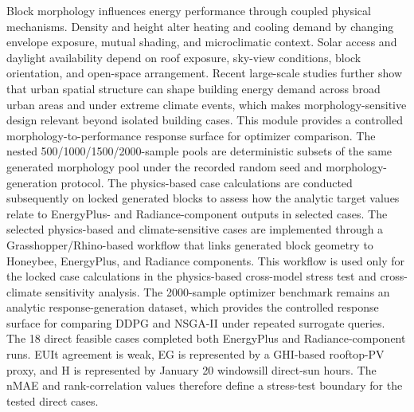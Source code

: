 \documentclass[10pt]{article}
\begin{document}
\begin{revisionbox}
Block morphology influences energy performance through coupled physical mechanisms. Density and height alter heating and cooling demand by changing envelope exposure, mutual shading, and microclimatic context. Solar access and daylight availability depend on roof exposure, sky-view conditions, block orientation, and open-space arrangement. Recent large-scale studies further show that urban spatial structure can shape building energy demand across broad urban areas and under extreme climate events, which makes morphology-sensitive design relevant beyond isolated building cases.
\revisionseparator
{}
This module provides a controlled morphology-to-performance response surface for optimizer comparison. The nested 500/1000/1500/2000-sample pools are deterministic subsets of the same generated morphology pool under the recorded random seed and morphology-generation protocol. The physics-based case calculations are conducted subsequently on locked generated blocks to assess how the analytic target values relate to EnergyPlus- and Radiance-component outputs in selected cases.
\revisionseparator
{}
The selected physics-based and climate-sensitive cases are implemented through a Grasshopper/Rhino-based workflow that links generated block geometry to Honeybee, EnergyPlus, and Radiance components. This workflow is used only for the locked case calculations in the physics-based cross-model stress test and cross-climate sensitivity analysis. The 2000-sample optimizer benchmark remains an analytic response-generation dataset, which provides the controlled response surface for comparing DDPG and NSGA-II under repeated surrogate queries.
\revisionseparator
{}
The 18 direct feasible cases completed both EnergyPlus and Radiance-component runs. EUIt agreement is weak, EG is represented by a GHI-based rooftop-PV proxy, and H is represented by January 20 windowsill direct-sun hours. The nMAE and rank-correlation values therefore define a stress-test boundary for the tested direct cases.
\end{revisionbox}
\end{document}
